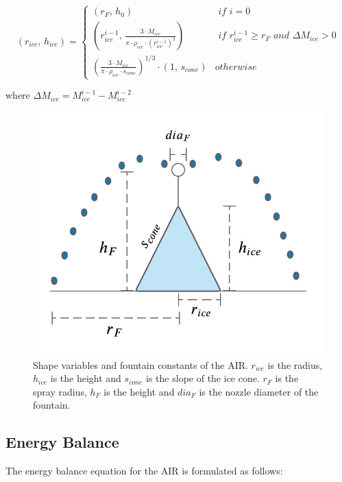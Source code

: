 \documentclass[utf8]{frontiersSCNS} %
\begin{document}
\begin{equation} (r_{ice},\, h_{ice}) = \left\{ \begin{array}{ll} (r_F ,\, h_0)                                                                        & \textit{ if } i=0 \\
             (r_{ice}^{i-1},\, \frac{3 \cdot M_{ice}}{\pi \cdot \rho_{ice} \cdot {(r_{ice}^{i-1})}^2}) & \textit{ if }
             r_{ice}^{i-1} \geq r_{F} \textit{ and } \Delta M_{ice} > 0                                                    \\ (\frac{3 \cdot M_{ice}}{\pi \cdot \rho_{ice} \cdot s_{cone}})^{1/3} \cdot (1,\,  s_{cone}) &
             otherwise\end{array} \right.  \label{eqn:A2} \end{equation}

where $\Delta M_{ice} = M_{ice}^{i-1} - M_{ice}^{i-2}$

\begin{figure} \begin{center} \includegraphics[width=10
			cm]{Figures/Figure_5.jpg} \end{center} \caption{Shape variables and fountain constants of the AIR. $r_{ice}$ is
		the radius, $h_{ice}$ is the height and $s_{cone}$ is the slope of the ice cone. $r_F$ is the spray radius, $h_F$ is the
		height and $dia_F$ is the nozzle diameter of the fountain.} \label{fig:shape} \end{figure}

\subsection{Energy Balance} \label{section:EB}

The energy balance equation \citep{Hock_2005} for the AIR is formulated as follows:
\end{document}
